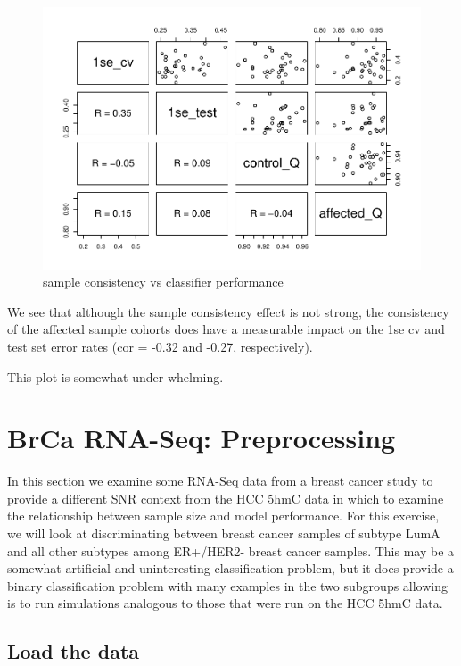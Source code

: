 \documentclass[
]{book}
\begin{document}
\begin{figure}
\centering
\includegraphics{Static/figures/hcc5hmC-glmnetSuite-small-sample-qual-1.pdf}
\caption{\label{fig:hcc5hmC-glmnetSuite-small-sample-qual}sample consistency vs classifier performance}
\end{figure}

We see that although the sample consistency effect is not strong, the consistency of the
affected sample cohorts does have a measurable impact on the 1se cv and test set error
rates (cor = -0.32 and -0.27, respectively).

This plot is somewhat under-whelming.

\hypertarget{brca-rnaseq-preproc}{%
\chapter{BrCa RNA-Seq: Preprocessing}\label{brca-rnaseq-preproc}}

In this section we examine some RNA-Seq data from a breast cancer study
to provide a different SNR context from the HCC 5hmC data in which
to examine the relationship between sample size and model performance.
For this exercise, we will look at discriminating between breast
cancer samples of subtype LumA and all other subtypes among ER+/HER2-
breast cancer samples. This may
be a somewhat artificial and uninteresting classification problem,
but it does provide a binary classification problem with many examples
in the two subgroups allowing is to run simulations analogous to
those that were run on the HCC 5hmC data.

\hypertarget{load-the-data-1}{%
\section{Load the data}\label{load-the-data-1}}
\end{document}
